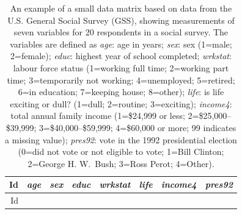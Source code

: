 \documentclass[11pt,a4paper,openany]{book}
\begin{document}
\begin{longtable}[]{@{}rrrrrrrr@{}}
\caption{\label{tab:t-datamatrix} An example of a small data matrix based on
data from the U.S. General Social Survey (GSS), showing measurements of
seven variables for 20 respondents in a social survey. The variables are
defined as \emph{age}: age in years; \emph{sex}: sex (1=male; 2=female);
\emph{educ}: highest year of school completed; \emph{wrkstat}: labour
force status (1=working full time; 2=working part time; 3=temporarily
not working; 4=unemployed; 5=retired; 6=in education; 7=keeping house;
8=other); \emph{life}: is life exciting or dull? (1=dull; 2=routine;
3=exciting); \emph{income4}: total annual family income (1=\$24,999 or
less; 2=\$25,000--\$39,999; 3=\$40,000--\$59,999; 4=\$60,000 or more; 99
indicates a missing value); \emph{pres92}: vote in the 1992 presidential
election (0=did not vote or not eligible to vote; 1=Bill Clinton;
2=George H. W.~Bush; 3=Ross Perot; 4=Other).}\tabularnewline
\toprule
\begin{minipage}[b]{0.07\columnwidth}\raggedleft\strut
Id\strut
\end{minipage} & \begin{minipage}[b]{0.08\columnwidth}\raggedleft\strut
\emph{age}\strut
\end{minipage} & \begin{minipage}[b]{0.08\columnwidth}\raggedleft\strut
\emph{sex}\strut
\end{minipage} & \begin{minipage}[b]{0.09\columnwidth}\raggedleft\strut
\emph{educ}\strut
\end{minipage} & \begin{minipage}[b]{0.12\columnwidth}\raggedleft\strut
\emph{wrkstat}\strut
\end{minipage} & \begin{minipage}[b]{0.09\columnwidth}\raggedleft\strut
\emph{life}\strut
\end{minipage} & \begin{minipage}[b]{0.12\columnwidth}\raggedleft\strut
\emph{income4}\strut
\end{minipage} & \begin{minipage}[b]{0.12\columnwidth}\raggedleft\strut
\emph{pres92}\strut
\end{minipage}\tabularnewline
\midrule
\endfirsthead
\toprule
\begin{minipage}[b]{0.07\columnwidth}\raggedleft\strut
Id\strut
\end{minipage} & \begin{minipage}[b]{0.08\columnwidth}\raggedleft\strut

\end{minipage}
\end{longtable}
\end{document}
